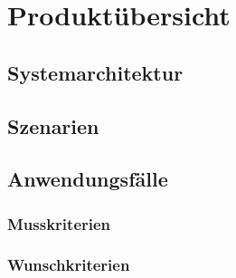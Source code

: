 \section{Produktübersicht}
\subsection{Systemarchitektur}
\subsection{Szenarien}
\subsection{Anwendungsfälle}
\subsubsection{Musskriterien}
\subsubsection{Wunschkriterien}